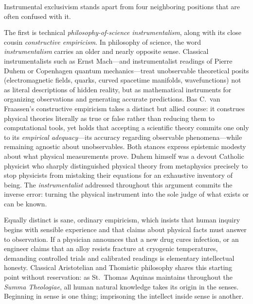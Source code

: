 Instrumental exclusivism stands apart from four neighboring positions that are often confused with it.

The first is technical \emph{philosophy-of-science instrumentalism}, along with its close cousin \emph{constructive empiricism}. In philosophy of science, the word \emph{instrumentalism} carries an older and nearly opposite sense. Classical instrumentalists such as Ernst Mach---and instrumentalist readings of Pierre Duhem or Copenhagen quantum mechanics---treat unobservable theoretical posits (electromagnetic fields, quarks, curved spacetime manifolds, wavefunctions) not as literal descriptions of hidden reality, but as mathematical instruments for organizing observations and generating accurate predictions. Bas C.\ van Fraassen's constructive empiricism takes a distinct but allied course: it construes physical theories literally as true or false rather than reducing them to computational tools, yet holds that accepting a scientific theory commits one only to its \emph{empirical adequacy}---its accuracy regarding observable phenomena---while remaining agnostic about unobservables. Both stances express epistemic modesty about what physical measurements prove. Duhem himself was a devout Catholic physicist who sharply distinguished physical theory from metaphysics precisely to stop physicists from mistaking their equations for an exhaustive inventory of being. The \emph{instrumentalist} addressed throughout this argument commits the inverse error: turning the physical instrument into the sole judge of what exists or can be known.

Equally distinct is sane, ordinary empiricism, which insists that human inquiry begins with sensible experience and that claims about physical facts must answer to observation. If a physician announces that a new drug cures infection, or an engineer claims that an alloy resists fracture at cryogenic temperatures, demanding controlled trials and calibrated readings is elementary intellectual honesty. Classical Aristotelian and Thomistic philosophy shares this starting point without reservation: as St.\ Thomas Aquinas maintains throughout the \emph{Summa Theologiae}, all human natural knowledge takes its origin in the senses. Beginning in sense is one thing; imprisoning the intellect inside sense is another.

